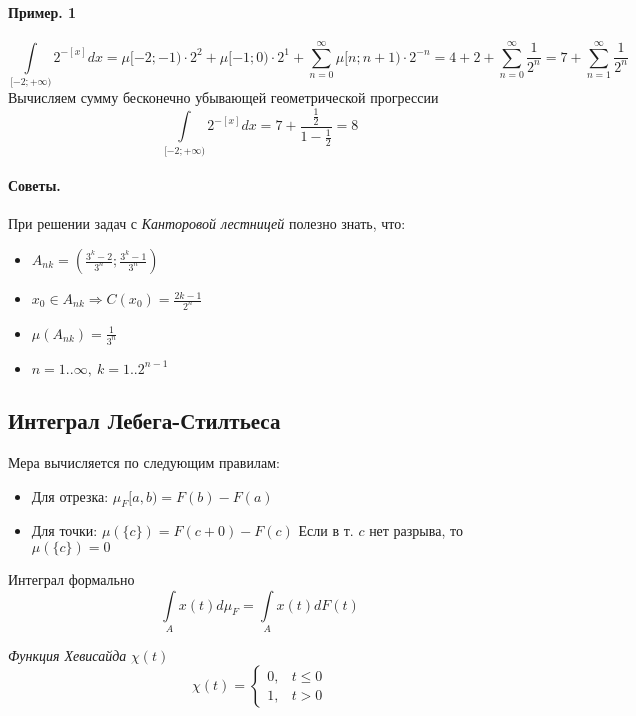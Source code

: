 \documentclass{article}[12pt]
\begin{document}
\paragraph{Пример. 1}
\begin{displaymath}
    \int\limits_{[-2;+\infty)}2^{-[x]}dx
    =\mu{[-2;-1)}\cdot2^{2} + \mu{[-1;0)}\cdot2^{1}
    + \sum\limits_{n=0}^{\infty}\mu{[n;n+1)}\cdot 2^{-n}
    =4 + 2 + \sum\limits_{n=0}^{\infty}\frac{1}{2^{n}}
    =7 + \sum\limits_{n=1}^{\infty}\frac{1}{2^{n}}
\end{displaymath}
Вычисляем сумму бесконечно убывающей геометрической прогрессии
\begin{displaymath}
    \int\limits_{[-2;+\infty)}2^{-[x]}dx
    = 7 + \frac{\frac{1}{2}}{1-\frac{1}{2}}=8
\end{displaymath}

\paragraph{Советы.} При решении задач с \textit{Канторовой лестницей} полезно знать,
что:
\begin{itemize}
    \item $A_{nk}=\left(\frac{3^{k}-2}{3^{n}};\frac{3^{k}-1}{3^{n}}\right)$
    \item $x_{0}\in A_{nk} \Rightarrow C(x_{0})=\frac{2k-1}{2^{n}}$
    \item $\mu(A_{nk})=\frac{1}{3^{n}}$
    \item $n=1..\infty,\ k=1..2^{n-1}$
\end{itemize}

\subsection{Интеграл Лебега-Стилтьеса}
Мера вычисляется по следующим правилам:
\begin{itemize}
    \item Для отрезка: $\mu_{F}[a,b)=F(b)-F(a)$
    \item Для точки: $\mu(\{c\})=F(c+0)-F(c)$
        \subitem Если в т. $c$ нет разрыва, то $\mu(\{c\})=0$
\end{itemize}
\par Интеграл формально
\begin{displaymath}
    \int\limits_{A}x(t)d\mu_{F}=\int\limits_{A}x(t)dF(t)
\end{displaymath}

\par \textit{Функция Хевисайда} $\chi(t)$
\begin{displaymath}
    \chi(t)=\left\{\begin{array}{ll}
    0, & t \leqslant 0 \\
    1, & t > 0
    \end{array}\right.
\end{displaymath}
\end{document}
